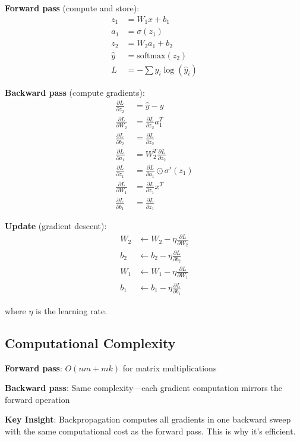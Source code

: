 \textbf{Forward pass} (compute and store):
\begin{align*}
z_1 &= W_1 x + b_1 \\
a_1 &= \sigma(z_1) \\
z_2 &= W_2 a_1 + b_2 \\
\hat{y} &= \text{softmax}(z_2) \\
L &= -\sum y_i \log(\hat{y}_i)
\end{align*}

\textbf{Backward pass} (compute gradients):
\begin{align*}
\frac{\partial L}{\partial z_2} &= \hat{y} - y \\
\frac{\partial L}{\partial W_2} &= \frac{\partial L}{\partial z_2} a_1^T \\
\frac{\partial L}{\partial b_2} &= \frac{\partial L}{\partial z_2} \\
\frac{\partial L}{\partial a_1} &= W_2^T \frac{\partial L}{\partial z_2} \\
\frac{\partial L}{\partial z_1} &= \frac{\partial L}{\partial a_1} \odot \sigma'(z_1) \\
\frac{\partial L}{\partial W_1} &= \frac{\partial L}{\partial z_1} x^T \\
\frac{\partial L}{\partial b_1} &= \frac{\partial L}{\partial z_1}
\end{align*}

\textbf{Update} (gradient descent):
\begin{align*}
W_2 &\leftarrow W_2 - \eta \frac{\partial L}{\partial W_2} \\
b_2 &\leftarrow b_2 - \eta \frac{\partial L}{\partial b_2} \\
W_1 &\leftarrow W_1 - \eta \frac{\partial L}{\partial W_1} \\
b_1 &\leftarrow b_1 - \eta \frac{\partial L}{\partial b_1}
\end{align*}

where $\eta$ is the learning rate.

\subsection{Computational Complexity}

\textbf{Forward pass}: $O(nm + mk)$ for matrix multiplications

\textbf{Backward pass}: Same complexity---each gradient computation mirrors the forward operation

\textbf{Key Insight}: Backpropagation computes all gradients in one backward sweep with the same computational cost as the forward pass. This is why it's efficient.

